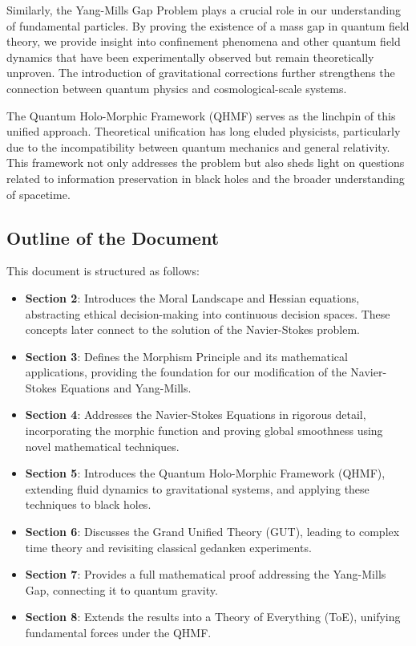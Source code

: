 \documentclass{article}
\begin{document}
Similarly, the Yang-Mills Gap Problem plays a crucial role in our understanding of fundamental particles. By proving the existence of a mass gap in quantum field theory, we provide insight into confinement phenomena and other quantum field dynamics that have been experimentally observed but remain theoretically unproven. The introduction of gravitational corrections further strengthens the connection between quantum physics and cosmological-scale systems.

The Quantum Holo-Morphic Framework (QHMF) serves as the linchpin of this unified approach. Theoretical unification has long eluded physicists, particularly due to the incompatibility between quantum mechanics and general relativity. This framework not only addresses the problem but also sheds light on questions related to information preservation in black holes and the broader understanding of spacetime.

\subsection{Outline of the Document}

This document is structured as follows:
\begin{itemize}
    \item \textbf{Section 2}: Introduces the Moral Landscape and Hessian equations, abstracting ethical decision-making into continuous decision spaces. These concepts later connect to the solution of the Navier-Stokes problem.
    \item \textbf{Section 3}: Defines the Morphism Principle and its mathematical applications, providing the foundation for our modification of the Navier-Stokes Equations and Yang-Mills.
    \item \textbf{Section 4}: Addresses the Navier-Stokes Equations in rigorous detail, incorporating the morphic function and proving global smoothness using novel mathematical techniques.
    \item \textbf{Section 5}: Introduces the Quantum Holo-Morphic Framework (QHMF), extending fluid dynamics to gravitational systems, and applying these techniques to black holes.
    \item \textbf{Section 6}: Discusses the Grand Unified Theory (GUT), leading to complex time theory and revisiting classical gedanken experiments.
    \item \textbf{Section 7}: Provides a full mathematical proof addressing the Yang-Mills Gap, connecting it to quantum gravity.
    \item \textbf{Section 8}: Extends the results into a Theory of Everything (ToE), unifying fundamental forces under the QHMF.
\end{itemize}
\end{document}
